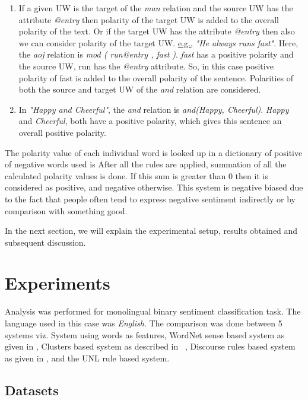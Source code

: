 \begin{enumerate}
\item If a given UW is the target of the \textit{man} relation and the source UW has the attribute \textit{@entry} then polarity of the target UW is added to the overall polarity of 
the text. Or if the target UW has the attribute \textit{@entry} then also we can consider polarity of the target UW. 
\underline{e.g.,} \textit{"He always runs fast"}. Here, the \textit{aoj} relation is \textit{mod ( run@entry , fast )}. \textit{fast} has a positive polarity and the source UW, run 
has the \textit{@entry} attribute. So, in this case positive polarity of fast is added to the overall polarity of the sentence.
Polarities of both the source and target UW of the \textit{and} relation are considered. \\
\item In \textit{"Happy and Cheerful"}, the \textit{and} relation is \textit{and(Happy, Cheerful)}. \textit{Happy} and \textit{Cheerful}, both have a positive
polarity, which gives this sentence an overall positive polarity.
 
\end{enumerate} 
 
The polarity value of each individual word is looked up in a dictionary of positive of negative words used is \citep*{liu2010sentiment} After all the rules are applied, summation of all the calculated polarity values is done. 
If this sum is greater than 0 then it is considered as positive, and negative otherwise. This system is negative biased due to the fact that people often tend to express negative sentiment 
indirectly or by comparison with something good. 

In the next section, we will explain the experimental setup, results obtained and subsequent discussion.

\section{Experiments}

Analysis was performed for monolingual binary sentiment classification task. The language used in this case was \textit{English}. The comparison was done between 5 systems 
viz. System using words as features, WordNet sense based system as given in \citep*{balamurali2011harnessing}, Clusters based system as described in ~\citep*{arhaves}, 
Discourse rules based system as given in \citep*{mukherjee2012sentiment}, and the UNL rule based system. 

\subsection{Datasets}

